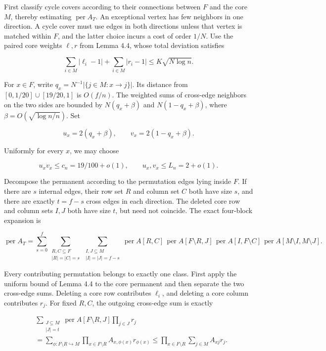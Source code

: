 \documentclass[11pt,a4paper]{article}
\begin{document}
First classify cycle covers according to their connections between \(F\) and the core \(M\), thereby estimating \(\operatorname{per}A_T\). An exceptional vertex has few neighbors in one direction. A cycle cover must use edges in both directions unless that vertex is matched within \(F\), and the latter choice incurs a cost of order \(1/N\). Use the paired core weights \(\ell,r\) from Lemma 4.4, whose total deviation satisfies

\[
\sum_{i\in M}|\ell_i-1|+\sum_{i\in M}|r_i-1|
\le K\sqrt{N\log n}.
\]

For \(x\in F\), write \(q_x=N^{-1}|\{j\in M:x\to j\}|\). Its distance from \([0,1/20]\cup[19/20,1]\) is \(O(f/n)\). The weighted sums of cross-edge neighbors on the two sides are bounded by \(N(q_x+\beta)\) and \(N(1-q_x+\beta)\), where \(\beta=O(\sqrt{\log n/n})\). Set

\[
u_x=2(q_x+\beta),\qquad v_x=2(1-q_x+\beta).
\]

Uniformly for every \(x\), we may choose

\[
u_xv_x\le c_n=19/100+o(1),\qquad
u_x,v_x\le L_n=2+o(1).
\]

Decompose the permanent according to the permutation edges lying inside \(F\). If there are \(s\) internal edges, their row set \(R\) and column set \(C\) both have size \(s\), and there are exactly \(t=f-s\) cross edges in each direction. The deleted core row and column sets \(I,J\) both have size \(t\), but need not coincide. The exact four-block expansion is

\[
\operatorname{per}A_T
=\sum_{s=0}^{f}
\sum_{\substack{R,C\subseteq F\\|R|=|C|=s}}
\sum_{\substack{I,J\subseteq M\\|I|=|J|=f-s}}
\operatorname{per}A[R,C]\,
\operatorname{per}A[F\setminus R,J]\,
\operatorname{per}A[I,F\setminus C]\,
\operatorname{per}A[M\setminus I,M\setminus J].
\]

Every contributing permutation belongs to exactly one class. First apply the uniform bound of Lemma 4.4 to the core permanent and then separate the two cross-edge sums. Deleting a core row contributes \(\ell_i\), and deleting a core column contributes \(r_j\). For fixed \(R,C\), the outgoing cross-edge sum is exactly

\[
\begin{aligned}
&\sum_{\substack{J\subseteq M\\|J|=t}}
\operatorname{per}A[F\setminus R,J]\prod_{j\in J}r_j\\
&=\sum_{\phi:F\setminus R\hookrightarrow M}
\prod_{x\in F\setminus R}A_{x,\phi(x)}r_{\phi(x)}
\le\prod_{x\in F\setminus R}\sum_{j\in M}A_{xj}r_j.
\end{aligned}
\]
\end{document}
